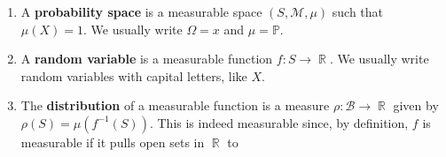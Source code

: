 \documentclass[12pt, a4paper]{article}
\DeclareMathOperator{\R}{\mathbb{R}}
\renewcommand{\Pr}{\mathbb{P}}
\theoremstyle{nonumberplain}
\begin{document}
\begin{enumerate}
    \item A \textbf{probability space} is a measurable space $(S,\mathcal{M},\mu)$ such that $\mu(X)=1$.
        We usually write $\Omega=x$ and $\mu=\Pr$.
    \item A \textbf{random variable} is a measurable function $f:S\to\R$.
        We usually write random variables with capital letters, like $X$.
    \item The \textbf{distribution} of a measurable function is a measure $\rho:\mathcal{B}\to\R$ given by $\rho(S)=\mu(f^{-1}(S))$.
        This is indeed measurable since, by definition, $f$ is measurable if it pulls open sets in $\R$ to
\end{enumerate}
\end{document}
